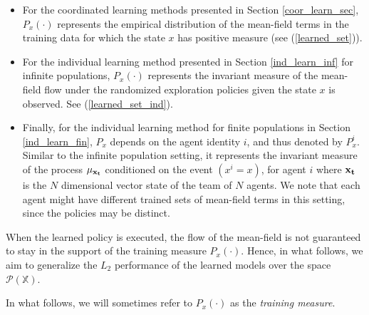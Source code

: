\documentclass[twoside,11pt]{article}
\def\P{{\mathcal P}}
\begin{document}
\begin{itemize}
\item  For the coordinated learning methods presented in Section \ref{coor_learn_sec}, $P_{x}(\cdot)$ represents the empirical distribution of the mean-field terms in the training data for which the state $x$ has positive measure (see (\ref{learned_set})).
 \item For the individual learning method presented in Section \ref{ind_learn_inf} for infinite populations, $P_{x}(\cdot)$ represents the invariant measure of the mean-field flow under the randomized exploration policies given the state $x$ is observed. See (\ref{learned_set_ind}).
\item Finally, for the individual learning method for finite populations in Section \ref{ind_learn_fin}, $P_{x}$ depends on the agent identity $i$, and thus denoted by $P^i_x$. Similar to the infinite population setting, it represents the invariant measure of the process $\mu_{\bf x_t}$ conditioned on the event $(x^i=x)$,  for agent $i$ where ${\bf x_t}$ is the $N$ dimensional vector state of the team of $N$ agents. We note that each agent might have different trained sets of mean-field terms in this setting, since the policies may be distinct. 
\end{itemize} 

 When the learned policy is executed, the flow of the mean-field is not guaranteed to stay in the support of the training measure $P_{x}(\cdot)$.  Hence, in what follows, we aim to generalize the $L_2$ performance of the learned models over the space $\P(\mathds{X})$.

In what follows, we will sometimes refer to $P_{x}(\cdot)$ as the {\it training measure}.
\end{document}
